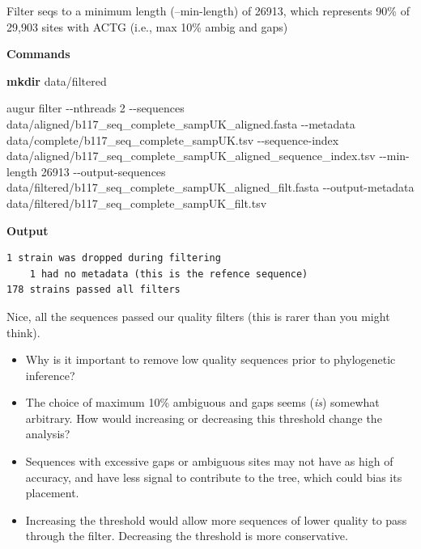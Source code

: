 \documentclass[
]{book}
\newenvironment{Shaded}{\begin{snugshade}}{\end{snugshade}}
\newcommand{\AttributeTok}[1]{\textcolor[rgb]{0.13,0.29,0.53}{#1}}
\newcommand{\ExtensionTok}[1]{#1}
\newcommand{\FunctionTok}[1]{\textcolor[rgb]{0.13,0.29,0.53}{\textbf{#1}}}
\newcommand{\NormalTok}[1]{#1}
\providecommand{\tightlist}{%
  \setlength{\itemsep}{0pt}\setlength{\parskip}{0pt}}
\begin{document}
Filter seqs to a minimum length (--min-length) of 26913, which represents 90\% of 29,903 sites with ACTG (i.e., max 10\% ambig and gaps)

\textbf{Commands}

\begin{Shaded}
\begin{Highlighting}[]
\FunctionTok{mkdir}\NormalTok{ data/filtered}

\ExtensionTok{augur}\NormalTok{ filter }\AttributeTok{{-}{-}nthreads}\NormalTok{ 2 }\AttributeTok{{-}{-}sequences}\NormalTok{ data/aligned/b117\_seq\_complete\_sampUK\_aligned.fasta }\AttributeTok{{-}{-}metadata}\NormalTok{ data/complete/b117\_seq\_complete\_sampUK.tsv }\AttributeTok{{-}{-}sequence{-}index}\NormalTok{ data/aligned/b117\_seq\_complete\_sampUK\_aligned\_sequence\_index.tsv }\AttributeTok{{-}{-}min{-}length}\NormalTok{ 26913 }\AttributeTok{{-}{-}output{-}sequences}\NormalTok{ data/filtered/b117\_seq\_complete\_sampUK\_aligned\_filt.fasta }\AttributeTok{{-}{-}output{-}metadata}\NormalTok{ data/filtered/b117\_seq\_complete\_sampUK\_filt.tsv }
\end{Highlighting}
\end{Shaded}

\textbf{Output}

\begin{verbatim}
1 strain was dropped during filtering
    1 had no metadata (this is the refence sequence)
178 strains passed all filters
\end{verbatim}

Nice, all the sequences passed our quality filters (this is rarer than you might think).

\begin{itemize}
\tightlist
\item
  Why is it important to remove low quality sequences prior to phylogenetic inference?
\item
  The choice of maximum 10\% ambiguous and gaps seems (\emph{is}) somewhat arbitrary. How would increasing or decreasing this threshold change the analysis?
\end{itemize}

\begin{itemize}
\tightlist
\item
  Sequences with excessive gaps or ambiguous sites may not have as high of accuracy, and have less signal to contribute to the tree, which could bias its placement.
\item
  Increasing the threshold would allow more sequences of lower quality to pass through the filter. Decreasing the threshold is more conservative.
\end{itemize}
\end{document}
